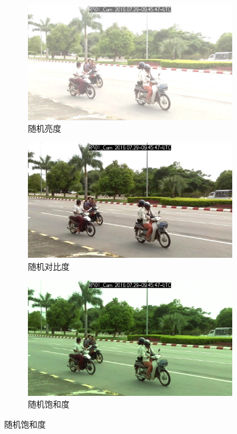\begin{figure}[htbp]
    \centering
    \begin{subfigure}[t]{0.3\textwidth}
        \centering
        \includegraphics[width=\textwidth]{figs/chap03/rb_origin.jpg}
        \caption{随机亮度}
        \label{fig:sub1}
    \end{subfigure}
    \begin{subfigure}[t]{0.3\textwidth}
        \centering
        \includegraphics[width=\textwidth]{figs/chap03/rc_origin.jpg}
        \caption{随机对比度}
        \label{fig:sub2}
    \end{subfigure}
    \begin{subfigure}[t]{0.3\textwidth}
        \centering
        \includegraphics[width=\textwidth]{figs/chap03/rs_origin.jpg}
        \caption{随机饱和度}
        \label{fig:sub3}
    \end{subfigure}


\end{figure}
